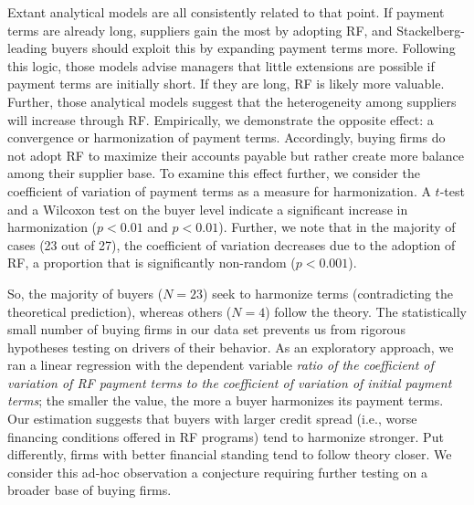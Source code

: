 \documentclass[A4,11pt]{article}
\renewcommand{\~}[1]{\tilde{#1}}
\renewcommand{\-}[1]{\overline{#1}}
\begin{document}
Extant analytical models \citep{Hu2018,Kouvelis2020,Lekkakos2016,Tanrisever2012,vanderVliet2015,Wuttke2016} are all consistently related to that point. If payment terms are already long, suppliers gain the most by adopting RF, and Stackelberg-leading buyers should exploit this by expanding payment terms more. Following this logic, those models advise managers that little extensions are possible if payment terms are initially short. If they are long, RF is likely more valuable. Further, those analytical models suggest that the heterogeneity among suppliers will increase through RF. Empirically, we demonstrate the opposite effect: a convergence or harmonization of payment terms. Accordingly, buying firms do not adopt RF to maximize their accounts payable but rather create more balance among their supplier base. To examine this effect further, we consider the coefficient of variation of payment terms as a measure for harmonization. A $t$-test and a Wilcoxon test on the buyer level indicate a significant increase in harmonization ($p<0.01$ and $p<0.01$). Further, we note that in the majority of cases (23 out of 27), the coefficient of variation decreases due to the adoption of RF, a proportion that is significantly non-random ($p<0.001$).

So, the majority of buyers ($N=23$) seek to harmonize terms (contradicting the theoretical prediction), whereas others ($N=4$) follow the theory. The statistically small number of buying firms in our data set prevents us from rigorous hypotheses testing on drivers of their behavior. As an exploratory approach, we ran a linear regression with the dependent variable \textit{ratio of the coefficient of variation of RF payment terms to the coefficient of variation of initial payment terms}; the smaller the value, the more a buyer harmonizes its payment terms. Our estimation suggests that buyers with larger credit spread (i.e., worse financing conditions offered in RF programs) tend to harmonize stronger. Put differently, firms with better financial standing tend to follow theory closer. We consider this ad-hoc observation a conjecture requiring further testing on a broader base of buying firms.
\end{document}
